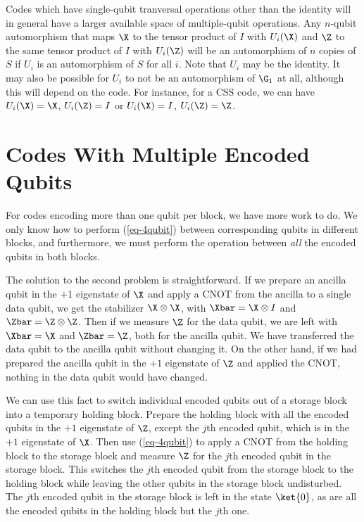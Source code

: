 Codes which have single-qubit tranversal operations other than the
identity will in general have a larger available space of multiple-qubit
operations.  Any $n$-qubit automorphism that maps $\X$ to the tensor
product of $I$ with $U_i (\X)$ and $\Z$ to the same tensor product of $I$
with $U_i (\Z)$ will be an automorphism of $n$ copies of $S$ if $U_i$ is an
automorphism of $S$ for all $i$.  Note that $U_i$ may be the identity.  It
may also be possible for $U_i$ to not be an automorphism of $\G_1$ at all,
although this will depend on the code.  For instance, for a CSS code, we can
have $U_i (\X) = \X$, $U_i (\Z) = I$ or $U_i (\X) = I$, $U_i (\Z) = \Z$.

\section{Codes With Multiple Encoded Qubits}
\label{sec-multiple}

For codes encoding more than one qubit per block, we have more work to
do.  We only know how to perform (\ref{eq-4qubit}) between
corresponding qubits in different blocks, and furthermore, we must
perform the operation between {\em all} the encoded qubits in both
blocks.

The solution to the second problem is straightforward.  If we prepare an
ancilla qubit in the $+1$ eigenstate of $\X$ and apply a CNOT from the
ancilla to a single data qubit, we get the stabilizer $\X \otimes \X$, with
$\Xbar = \X \otimes I$ and $\Zbar = \Z \otimes \Z$.  Then if we measure
$\Z$ for the data qubit, we are left with $\Xbar = \X$ and $\Zbar = \Z$,
both for the ancilla qubit.  We have transferred the data qubit to the
ancilla qubit without changing it.  On the other hand, if we had prepared
the ancilla qubit in the $+1$ eigenstate of $\Z$ and applied the CNOT,
nothing in the data qubit would have changed.

We can use this fact to switch individual encoded qubits out of a storage
block into a temporary holding block.  Prepare the holding block with all
the encoded qubits in the $+1$ eigenstate of $\Z$, except the $j$th encoded
qubit, which is in the $+1$ eigenstate of $\X$.  Then use (\ref{eq-4qubit})
to apply a CNOT from the holding block to the storage block and measure $\Z$
for the $j$th encoded qubit in the storage block.  This switches the $j$th
encoded qubit from the storage block to the holding block while leaving the
other qubits in the storage block undisturbed.  The $j$th encoded qubit in the
storage block is left in the state $\ket{0}$, as are all the encoded
qubits in the holding block but the $j$th one.

